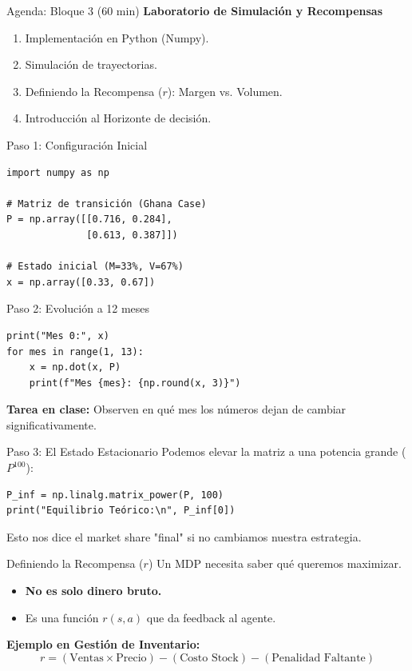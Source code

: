 \documentclass{beamer}
\begin{document}
\begin{frame}{Agenda: Bloque 3 (60 min)}
\textbf{Laboratorio de Simulación y Recompensas}
\begin{enumerate}
    \item Implementación en Python (Numpy).
    \item Simulación de trayectorias.
    \item Definiendo la Recompensa ($r$): Margen vs. Volumen.
    \item Introducción al Horizonte de decisión.
\end{enumerate}
\end{frame}

\begin{frame}[fragile]{Paso 1: Configuración Inicial}
\begin{verbatim}
import numpy as np

# Matriz de transición (Ghana Case)
P = np.array([[0.716, 0.284], 
              [0.613, 0.387]])

# Estado inicial (M=33%, V=67%)
x = np.array([0.33, 0.67])
\end{verbatim}
\end{frame}

\begin{frame}[fragile]{Paso 2: Evolución a 12 meses}
\begin{verbatim}
print("Mes 0:", x)
for mes in range(1, 13):
    x = np.dot(x, P)
    print(f"Mes {mes}: {np.round(x, 3)}")
\end{verbatim}
\vspace{0.3cm}
\textbf{Tarea en clase:} Observen en qué mes los números dejan de cambiar significativamente.
\end{frame}

\begin{frame}[fragile]{Paso 3: El Estado Estacionario}
Podemos elevar la matriz a una potencia grande ($P^{100}$):
\begin{verbatim}
P_inf = np.linalg.matrix_power(P, 100)
print("Equilibrio Teórico:\n", P_inf[0])
\end{verbatim}
\vspace{0.3cm}
Esto nos dice el market share "final" si no cambiamos nuestra estrategia.
\end{frame}

\begin{frame}{Definiendo la Recompensa ($r$)}
Un MDP necesita saber qué queremos maximizar.
\begin{itemize}
    \item \textbf{No es solo dinero bruto.}
    \item Es una función $r(s, a)$ que da feedback al agente.
\end{itemize}
\vspace{0.3cm}
\textbf{Ejemplo en Gestión de Inventario:}
\[ r = (\text{Ventas} \times \text{Precio}) - (\text{Costo Stock}) - (\text{Penalidad Faltante}) \]
\end{frame}
\end{document}
